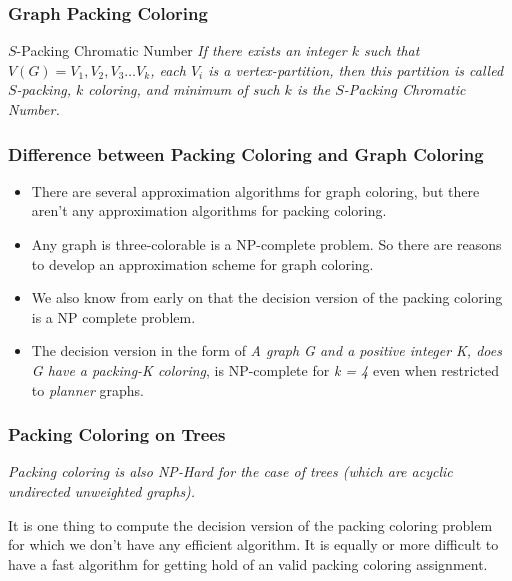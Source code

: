 \begin{frame}
    \frametitle{Graph Packing Coloring}

    \begin{define}{$S$-Packing Chromatic Number}{}
        \textit{If there exists an integer $k$ such that $V(G) = V_1, V_2, V_3 \dots V_k$, each $V_i$ is a vertex-partition, then this partition is called $S$-packing, $k$ coloring, and minimum of such $k$ is the $S$-Packing Chromatic Number.}
    \end{define}

\end{frame}

\begin{frame}
    \frametitle{Difference between Packing Coloring and Graph Coloring}

    
    \begin{itemize}
        \item There are several approximation algorithms for graph coloring, but there aren't any approximation algorithms for packing coloring.\pause
        \item Any graph is three-colorable is a \textsf{NP}-complete problem. So there are reasons to develop an approximation scheme for graph coloring.\pause
        \item We also know from early on that the decision version of the packing coloring is a \textsf{NP} complete problem.\pause
        \item The decision version in the form of \textit{A graph G and a positive integer K, does G have a packing-K coloring}, is \textsf{NP}-complete for \textit{k = 4} even when restricted to \textit{planner} graphs.
    \end{itemize}

\end{frame}

\begin{frame}
    \frametitle{Packing Coloring on Trees}

    \textit{Packing coloring is also \textsf{NP}-Hard for the case of trees (which are acyclic undirected unweighted graphs).}    

    \pause
    It is one thing to compute the decision version of the packing coloring problem for which we don't have any efficient algorithm. It is equally or more difficult to have a fast algorithm for getting hold of an valid packing coloring assignment.

\end{frame}

